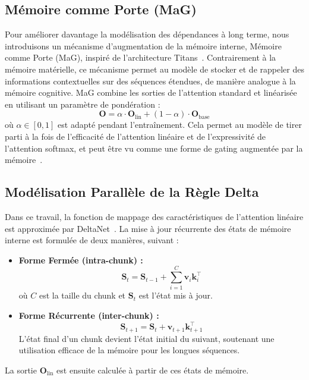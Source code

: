 \documentclass[10pt,a4paper]{article}
\begin{document}
\subsection{Mémoire comme Porte (MaG)}

Pour améliorer davantage la modélisation des dépendances à long terme, nous introduisons un mécanisme d'augmentation de la mémoire interne, Mémoire comme Porte (MaG), inspiré de l'architecture Titans~\cite{behrouz2024titans}. Contrairement à la mémoire matérielle, ce mécanisme permet au modèle de stocker et de rappeler des informations contextuelles sur des séquences étendues, de manière analogue à la mémoire cognitive. MaG combine les sorties de l'attention standard et linéarisée en utilisant un paramètre de pondération :
\begin{equation}
\mathbf{O} = \alpha \cdot \mathbf{O}_{\text{lin}} + (1-\alpha) \cdot \mathbf{O}_{\text{base}}
\end{equation}
où $\alpha \in [0,1]$ est adapté pendant l'entraînement. Cela permet au modèle de tirer parti à la fois de l'efficacité de l'attention linéaire et de l'expressivité de l'attention softmax, et peut être vu comme une forme de gating augmentée par la mémoire~\cite{behrouz2024titans, mercat2024linearizing}.

\subsection{Modélisation Parallèle de la Règle Delta}

Dans ce travail, la fonction de mappage des caractéristiques de l'attention linéaire est approximée par DeltaNet~\cite{yang2024parallelizing}. La mise à jour récurrente des états de mémoire interne est formulée de deux manières, suivant :
\begin{itemize}
    \item \textbf{Forme Fermée (intra-chunk) :}
    \begin{equation}
    \mathbf{S}_t = \mathbf{S}_{t-1} + \sum_{i=1}^{C} \mathbf{v}_i \mathbf{k}_i^\top
    \end{equation}
    où $C$ est la taille du chunk et $\mathbf{S}_t$ est l'état mis à jour.
    \item \textbf{Forme Récurrente (inter-chunk) :}
    \begin{equation}
    \mathbf{S}_{t+1} = \mathbf{S}_t + \mathbf{v}_{t+1} \mathbf{k}_{t+1}^\top
    \end{equation}
    L'état final d'un chunk devient l'état initial du suivant, soutenant une utilisation efficace de la mémoire pour les longues séquences.
\end{itemize}
La sortie $\mathbf{O}_{\text{lin}}$ est ensuite calculée à partir de ces états de mémoire.
\end{document}
